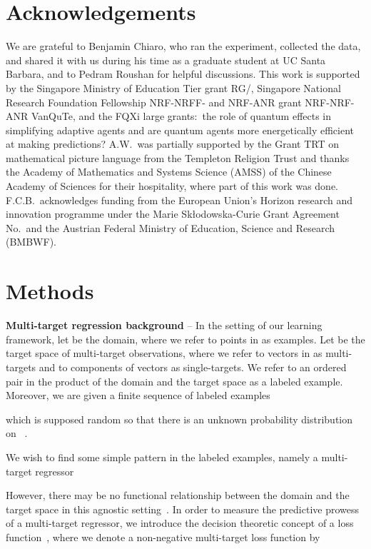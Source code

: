 \documentclass[aps,twocolumn,superscriptaddress,floatfix,preprintnumbers,showkeys]{revtex4}
\begin{document}
\section*{Acknowledgements}
We are grateful to Benjamin Chiaro, who ran the experiment, collected the data, and shared it with us during his time as a graduate student at UC Santa Barbara, and to Pedram Roushan for helpful discussions. This work is supported by the Singapore Ministry of Education Tier  grant RG/, Singapore National Research Foundation Fellowship NRF-NRFF- and NRF-ANR grant NRF-NRF-ANR VanQuTe, and the FQXi large grants:\ the role of quantum effects in simplifying adaptive agents and are quantum agents more energetically efficient at making predictions? A.W.\ was partially supported by the Grant TRT  on mathematical picture language from the Templeton Religion Trust and thanks the Academy of Mathematics and Systems Science (AMSS) of the Chinese Academy of Sciences for their hospitality, where part of this work was done. F.C.B.\ acknowledges funding from the European Union’s Horizon  research and innovation programme under the Marie Skłodowska-Curie Grant Agreement No.\  and the Austrian Federal Ministry of Education, Science and Research (BMBWF).

\section*{Methods}

\textbf{Multi-target regression background} -- In the setting of our learning framework, let  be the domain, where we refer to points in  as examples. Let  be the target space of multi-target observations, where we refer to vectors in  as multi-targets and to components of vectors as single-targets. We refer to an ordered pair in the product of the domain and the target space  as a labeled example. Moreover, we are given a finite sequence of labeled examples

which is supposed random so that there is an unknown probability distribution on ~\cite{Haussler_1992, Kearns_1994_1, Kearns_1994_2}.  

We wish to find some simple pattern in the labeled examples, namely a multi-target regressor 

However, there may be no functional relationship between the domain and the target space in this agnostic setting~\cite{Kearns_1994_1, Kearns_1994_2}. In order to measure the predictive prowess of a multi-target regressor, we introduce the decision theoretic concept of a loss function~\cite{Haussler_1992, Kearns_1994_1, Kearns_1994_2, Friedman_2001, Friedman_2003, Hastie_2009}, where we denote a non-negative multi-target loss function by 
\end{document}
